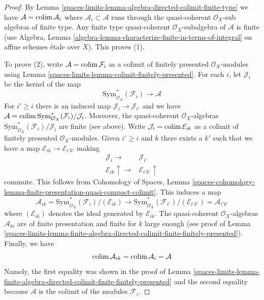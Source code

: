 \begin{proof}
By Lemma \ref{spaces-limits-lemma-algebra-directed-colimit-finite-type} we have
$\mathcal{A} = \operatorname{colim} \mathcal{A}_i$ where
$\mathcal{A}_i \subset \mathcal{A}$ runs through the
quasi-coherent $\mathcal{O}_X$-sub algebras of finite type.
Any finite type quasi-coherent $\mathcal{O}_X$-subalgebra
of $\mathcal{A}$ is finite (use Algebra, Lemma
\ref{algebra-lemma-characterize-finite-in-terms-of-integral}
on affine schemes \'etale over $X$). This proves (1).

\medskip\noindent
To prove (2), write $\mathcal{A} = \operatorname{colim} \mathcal{F}_i$
as a colimit of finitely presented $\mathcal{O}_X$-modules using
Lemma \ref{spaces-limits-lemma-colimit-finitely-presented}.
For each $i$, let $\mathcal{J}_i$ be the kernel of the map
$$
\text{Sym}^*_{\mathcal{O}_X}(\mathcal{F}_i) \longrightarrow \mathcal{A}
$$
For $i' \geq i$ there is an induced map $\mathcal{J}_i \to \mathcal{J}_{i'}$
and we have $\mathcal{A} =
\operatorname{colim} \text{Sym}^*_{\mathcal{O}_X}(\mathcal{F}_i)/\mathcal{J}_i$.
Moreover, the quasi-coherent $\mathcal{O}_X$-algebras
$\text{Sym}^*_{\mathcal{O}_X}(\mathcal{F}_i)/\mathcal{J}_i$
are finite (see above). Write $\mathcal{J}_i = \operatorname{colim} \mathcal{E}_{ik}$
as a colimit of finitely presented $\mathcal{O}_X$-modules.
Given $i' \geq i$ and $k$ there exists a $k'$ such that we
have a map $\mathcal{E}_{ik} \to \mathcal{E}_{i'k'}$
making
$$
\begin{array}{cc}\mathcal{J}_i \longrightarrow & \mathcal{J}_{i'} \\ \mathcal{E}_{ik} \uparrow\longrightarrow & \mathcal{E}_{i'k'} \uparrow\end{array}
$$
commute. This follows from
Cohomology of Spaces, Lemma
\ref{spaces-cohomology-lemma-finite-presentation-quasi-compact-colimit}.
This induces a map
$$
\mathcal{A}_{ik} =
\text{Sym}^*_{\mathcal{O}_X}(\mathcal{F}_i)/(\mathcal{E}_{ik})
\longrightarrow
\text{Sym}^*_{\mathcal{O}_X}(\mathcal{F}_{i'})/(\mathcal{E}_{i'k'}) =
\mathcal{A}_{i'k'}
$$
where $(\mathcal{E}_{ik})$ denotes the ideal generated by $\mathcal{E}_{ik}$.
The quasi-coherent $\mathcal{O}_X$-algebras $\mathcal{A}_{ki}$
are of finite presentation and finite for $k$ large enough
(see proof of
Lemma \ref{spaces-limits-lemma-finite-algebra-directed-colimit-finite-finitely-presented}).
Finally, we have
$$
\operatorname{colim} \mathcal{A}_{ik} = \operatorname{colim} \mathcal{A}_i = \mathcal{A}
$$
Namely, the first equality was shown in the proof of
Lemma \ref{spaces-limits-lemma-finite-algebra-directed-colimit-finite-finitely-presented}
and the second equality because $\mathcal{A}$ is the colimit of
the modules $\mathcal{F}_i$.
\end{proof}

